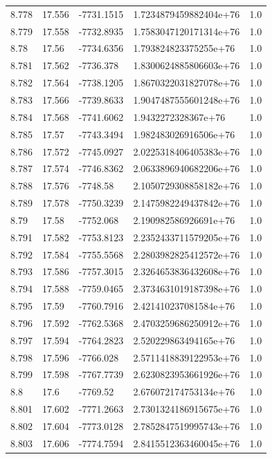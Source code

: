 \begin{tabular}{lllll}
8.778 & 17.556 & -7731.1515 & 1.7234879459882404e+76 & 1.0 \\
8.779 & 17.558 & -7732.8935 & 1.7583047120171314e+76 & 1.0 \\
8.78 & 17.56 & -7734.6356 & 1.793824823375255e+76 & 1.0 \\
8.781 & 17.562 & -7736.378 & 1.8300624885806603e+76 & 1.0 \\
8.782 & 17.564 & -7738.1205 & 1.8670322031827078e+76 & 1.0 \\
8.783 & 17.566 & -7739.8633 & 1.9047487555601248e+76 & 1.0 \\
8.784 & 17.568 & -7741.6062 & 1.9432272328367e+76 & 1.0 \\
8.785 & 17.57 & -7743.3494 & 1.982483026916506e+76 & 1.0 \\
8.786 & 17.572 & -7745.0927 & 2.0225318406405383e+76 & 1.0 \\
8.787 & 17.574 & -7746.8362 & 2.0633896940682206e+76 & 1.0 \\
8.788 & 17.576 & -7748.58 & 2.1050729308858182e+76 & 1.0 \\
8.789 & 17.578 & -7750.3239 & 2.1475982249437842e+76 & 1.0 \\
8.79 & 17.58 & -7752.068 & 2.190982586926691e+76 & 1.0 \\
8.791 & 17.582 & -7753.8123 & 2.2352433711579205e+76 & 1.0 \\
8.792 & 17.584 & -7755.5568 & 2.2803982825412572e+76 & 1.0 \\
8.793 & 17.586 & -7757.3015 & 2.3264653836432608e+76 & 1.0 \\
8.794 & 17.588 & -7759.0465 & 2.3734631019187398e+76 & 1.0 \\
8.795 & 17.59 & -7760.7916 & 2.421410237081584e+76 & 1.0 \\
8.796 & 17.592 & -7762.5368 & 2.4703259686250912e+76 & 1.0 \\
8.797 & 17.594 & -7764.2823 & 2.520229863494165e+76 & 1.0 \\
8.798 & 17.596 & -7766.028 & 2.5711418839122953e+76 & 1.0 \\
8.799 & 17.598 & -7767.7739 & 2.6230823953661926e+76 & 1.0 \\
8.8 & 17.6 & -7769.52 & 2.676072174753134e+76 & 1.0 \\
8.801 & 17.602 & -7771.2663 & 2.7301324186915675e+76 & 1.0 \\
8.802 & 17.604 & -7773.0128 & 2.7852847519995743e+76 & 1.0 \\
8.803 & 17.606 & -7774.7594 & 2.8415512363460045e+76 & 1.0 \\

\end{tabular}
